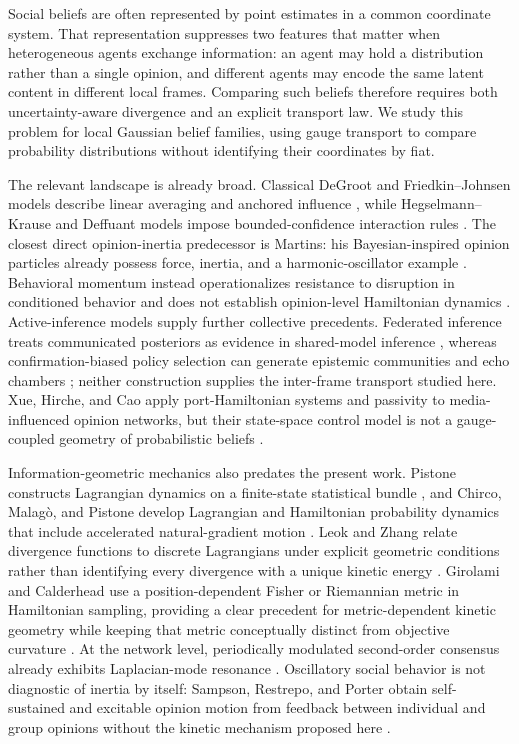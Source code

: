 \documentclass[12pt]{article}
\begin{document}
Social beliefs are often represented by point estimates in a common coordinate system. That representation suppresses two features that matter when heterogeneous agents exchange information: an agent may hold a distribution rather than a single opinion, and different agents may encode the same latent content in different local frames. Comparing such beliefs therefore requires both uncertainty-aware divergence and an explicit transport law. We study this problem for local Gaussian belief families, using gauge transport to compare probability distributions without identifying their coordinates by fiat.

The relevant landscape is already broad. Classical DeGroot and Friedkin--Johnsen models describe linear averaging and anchored influence \citep{degroot1974,friedkin1990}, while Hegselmann--Krause and Deffuant models impose bounded-confidence interaction rules \citep{hegselmann2002opinion,deffuant2000}. The closest direct opinion-inertia predecessor is Martins: his Bayesian-inspired opinion particles already possess force, inertia, and a harmonic-oscillator example \citep{Martins2015OpinionParticles}. Behavioral momentum instead operationalizes resistance to disruption in conditioned behavior and does not establish opinion-level Hamiltonian dynamics \citep{NevinMandellAtak1983}. Active-inference models supply further collective precedents. Federated inference treats communicated posteriors as evidence in shared-model inference \citep{friston2024federated}, whereas confirmation-biased policy selection can generate epistemic communities and echo chambers \citep{albarracin2022epistemic}; neither construction supplies the inter-frame transport studied here. Xue, Hirche, and Cao apply port-Hamiltonian systems and passivity to media-influenced opinion networks, but their state-space control model is not a gauge-coupled geometry of probabilistic beliefs \citep{XueHircheCao2020}.

Information-geometric mechanics also predates the present work. Pistone constructs Lagrangian dynamics on a finite-state statistical bundle \citep{Pistone2018StatisticalBundle}, and Chirco, Malag\`o, and Pistone develop Lagrangian and Hamiltonian probability dynamics that include accelerated natural-gradient motion \citep{ChircoMalagoPistone2022}. Leok and Zhang relate divergence functions to discrete Lagrangians under explicit geometric conditions rather than identifying every divergence with a unique kinetic energy \citep{LeokZhang2017}. Girolami and Calderhead use a position-dependent Fisher or Riemannian metric in Hamiltonian sampling, providing a clear precedent for metric-dependent kinetic geometry while keeping that metric conceptually distinct from objective curvature \citep{GirolamiCalderhead2011}. At the network level, periodically modulated second-order consensus already exhibits Laplacian-mode resonance \citep{BaumannSokolovTyloo2020}. Oscillatory social behavior is not diagnostic of inertia by itself: Sampson, Restrepo, and Porter obtain self-sustained and excitable opinion motion from feedback between individual and group opinions without the kinetic mechanism proposed here \citep{SampsonPorterRestrepo2025}.
\end{document}
